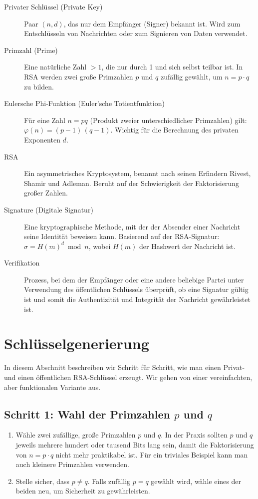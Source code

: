 \documentclass[a4paper,11pt]{article}
\begin{document}
\begin{description}
  \item[Privater Schlüssel (Private Key)] Paar \((n, d)\), das nur dem Empfänger (Signer) bekannt ist. Wird zum Entschlüsseln von Nachrichten oder zum Signieren von Daten verwendet.
  \item[Primzahl (Prime)] Eine natürliche Zahl \(>1\), die nur durch 1 und sich selbst teilbar ist. In RSA werden zwei große Primzahlen \(p\) und \(q\) zufällig gewählt, um \(n = p \cdot q\) zu bilden.
  \item[Eulersche Phi-Funktion (Euler’sche Totientfunktion)] Für eine Zahl \(n=pq\) (Produkt zweier unterschiedlicher Primzahlen) gilt: \(\varphi(n) = (p-1)\,(q-1)\). Wichtig für die Berechnung des privaten Exponenten \(d\).
  \item[RSA] Ein asymmetrisches Kryptosystem, benannt nach seinen Erfindern Rivest, Shamir und Adleman. Beruht auf der Schwierigkeit der Faktorisierung großer Zahlen.
  \item[Signature (Digitale Signatur)] Eine kryptographische Methode, mit der der Absender einer Nachricht seine Identität beweisen kann. Basierend auf der RSA-Signatur: \(\sigma = H(m)^d \bmod n\), wobei \(H(m)\) der Hashwert der Nachricht ist.
  \item[Verifikation] Prozess, bei dem der Empfänger oder eine andere beliebige Partei unter Verwendung des öffentlichen Schlüssels überprüft, ob eine Signatur gültig ist und somit die Authentizität und Integrität der Nachricht gewährleistet ist.
\end{description}

\newpage
\section{Schlüsselgenerierung}
\label{sec:schluesselgenerierung}
In diesem Abschnitt beschreiben wir Schritt für Schritt, wie man einen Privat- und einen öffentlichen RSA-Schlüssel erzeugt. Wir gehen von einer vereinfachten, aber funktionalen Variante aus.

\subsection{Schritt 1: Wahl der Primzahlen \(p\) und \(q\)}
\begin{enumerate}
  \item Wähle zwei zufällige, große Primzahlen \(p\) und \(q\). In der Praxis sollten \(p\) und \(q\) jeweils mehrere hundert oder tausend Bits lang sein, damit die Faktorisierung von \(n = p \cdot q\) nicht mehr praktikabel ist. Für ein triviales Beispiel kann man auch kleinere Primzahlen verwenden.
  \item Stelle sicher, dass \(p \neq q\). Falls zufällig \(p = q\) gewählt wird, wähle eines der beiden neu, um Sicherheit zu gewährleisten.
\end{enumerate}
\end{document}
